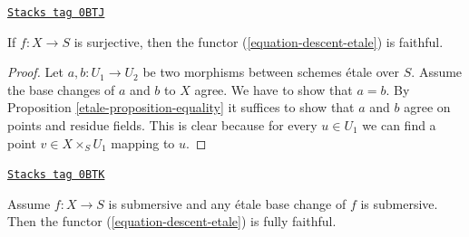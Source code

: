 \begin{lemma}[Faithful]
\label{etale-lemma-faithful}
\href{https://stacks.math.columbia.edu/tag/0BTJ}{\texttt{Stacks tag 0BTJ}}

If $f : X \to S$ is surjective, then the functor
(\ref{equation-descent-etale}) is faithful.
\end{lemma}

\begin{proof}

Let $a, b : U_1 \to U_2$ be two morphisms between schemes \'etale over $S$.
Assume the base changes of $a$ and $b$ to $X$ agree.
We have to show that $a = b$.
By Proposition \ref{etale-proposition-equality} it suffices to
show that $a$ and $b$ agree on points and residue fields.
This is clear because for every $u \in U_1$ we can find a point
$v \in X \times_S U_1$ mapping to $u$.
\end{proof}

\begin{lemma}
\label{etale-lemma-fully-faithful}
\href{https://stacks.math.columbia.edu/tag/0BTK}{\texttt{Stacks tag 0BTK}}

Assume $f : X \to S$ is submersive and any \'etale base change
of $f$ is submersive. Then the functor
(\ref{equation-descent-etale}) is fully faithful.
\end{lemma}

